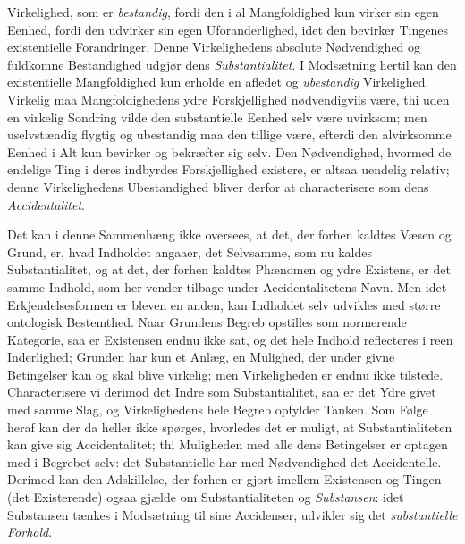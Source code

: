 \documentclass[12pt]{book}
\newcommand{\opage}[1]{\marginnote{\footnotesize\textit{[#1]}}}
\begin{document}
Virkelighed, som er \emph{bestandig}, fordi den i al Mangfoldighed kun virker sin egen
Eenhed, fordi den udvirker sin egen Uforanderlighed, idet den bevirker Tingenes
existentielle Forandringer. Denne Virkelighedens absolute Nødvendighed og fuldkomne
Bestandighed udgjør dens \emph{Substantialitet}.
\opage{162} I Modsætning hertil kan den existentielle Mangfoldighed kun erholde en afledet og
\emph{ubestandig} Virkelighed. Virkelig maa Mangfoldighedens ydre Forskjellighed
nødvendigviis være, thi uden en virkelig Sondring vilde den substantielle Eenhed selv
være uvirksom; men uselvstændig flygtig og ubestandig maa den tillige være, efterdi den
alvirksomme Eenhed i Alt kun bevirker og bekræfter sig selv. Den Nødvendighed, hvormed
de endelige Ting i deres indbyrdes Forskjellighed existere, er altsaa uendelig relativ;
denne Virkelighedens Ubestandighed bliver derfor at characterisere som dens
\emph{Accidentalitet}.

Det kan i denne Sammenhæng ikke oversees, at det, der forhen kaldtes Væsen og Grund,
er, hvad Indholdet angaaer, det Selvsamme, som nu kaldes Substantialitet, og at det,
der forhen kaldtes Phænomen og ydre Existens, er det samme Indhold, som her vender
tilbage under Accidentalitetens Navn. Men idet Erkjendelsesformen er bleven en anden,
kan Indholdet selv udvikles med større ontologisk Bestemthed. Naar Grundens Begreb
opstilles som normerende Kategorie, saa er Existensen endnu ikke sat, og det hele
Indhold reflecteres i reen Inderlighed; Grunden har kun et Anlæg, en Mulighed, der
under givne Betingelser kan og skal blive virkelig; men Virkeligheden er endnu ikke
tilstede. Characterisere vi derimod det Indre som Substantialitet, saa er det Ydre
givet med samme Slag, og Virkelighedens hele Begreb opfylder Tanken. Som Følge heraf
kan der da heller ikke spørges, hvorledes det er muligt, at Substantialiteten kan give
sig Accidentalitet; thi Muligheden med alle dens Betingelser er optagen med i Begrebet
selv: det Substantielle har med Nødvendighed det Accidentelle. Derimod kan den
Adskillelse, der forhen er gjort imellem
\opage{163} Existensen og Tingen (det Existerende) ogsaa gjælde om Substantialiteten og
\emph{Substansen}: idet Substansen tænkes i Modsætning til sine Accidenser, udvikler
sig det \emph{substantielle Forhold}.
\end{document}
